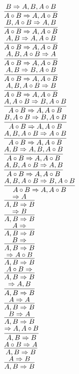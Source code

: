 \documentclass[11pt]{article}
\begin{document}
\begin{center}
\bigskip
\\$\infer{A\circ B\Rightarrow A, A\circ B}{B\Rightarrow A, B, A\circ B}$
\bigskip
\\$\infer{A\circ B\Rightarrow A, A\circ B}{B, A\circ B\Rightarrow A, B}$
\bigskip
\\$\infer{A\circ B\Rightarrow A, A\circ B}{A, B\Rightarrow A, A\circ B}$
\bigskip
\\$\infer{A\circ B\Rightarrow A, A\circ B}{A, B, A\circ B\Rightarrow A}$
\bigskip
\\$\infer{A\circ B\Rightarrow A, A\circ B}{A, B\Rightarrow B, A\circ B}$
\bigskip
\\$\infer{A\circ B\Rightarrow A, A\circ B}{A, B, A\circ B\Rightarrow B}$
\bigskip
\\$\infer{A\circ B\Rightarrow A, A\circ B}{A, A\circ B\Rightarrow B, A\circ B}$
\bigskip
\\$\infer{A\circ B\Rightarrow A, A\circ B}{B, A\circ B\Rightarrow B, A\circ B}$
\bigskip
\\$\infer{A\circ B\Rightarrow A, A\circ B}{A, B, A\circ B\Rightarrow A\circ B}$
\bigskip
\\$\infer{A\circ B\Rightarrow A, A\circ B}{A, B\Rightarrow A, B, A\circ B}$
\bigskip
\\$\infer{A\circ B\Rightarrow A, A\circ B}{A, B, A\circ B\Rightarrow A, B}$
\bigskip
\\$\infer{A\circ B\Rightarrow A, A\circ B}{A, B, A\circ B\Rightarrow B, A\circ B}$
\bigskip
\\$\infer{A, B\Rightarrow B}{\Rightarrow A}$
\bigskip
\\$\infer{A, B\Rightarrow B}{\Rightarrow B}$
\bigskip
\\$\infer{A, B\Rightarrow B}{A\Rightarrow }$
\bigskip
\\$\infer{A, B\Rightarrow B}{B\Rightarrow }$
\bigskip
\\$\infer{A, B\Rightarrow B}{\Rightarrow A\circ B}$
\bigskip
\\$\infer{A, B\Rightarrow B}{A\circ B\Rightarrow }$
\bigskip
\\$\infer{A, B\Rightarrow B}{\Rightarrow A, B}$
\bigskip
\\$\infer{A, B\Rightarrow B}{A\Rightarrow A}$
\bigskip
\\$\infer{A, B\Rightarrow B}{B\Rightarrow A}$
\bigskip
\\$\infer{A, B\Rightarrow B}{\Rightarrow A, A\circ B}$
\bigskip
\\$\infer{A, B\Rightarrow B}{A\circ B\Rightarrow A}$
\bigskip
\\$\infer{A, B\Rightarrow B}{A\Rightarrow B}$

\end{center}
\end{document}
